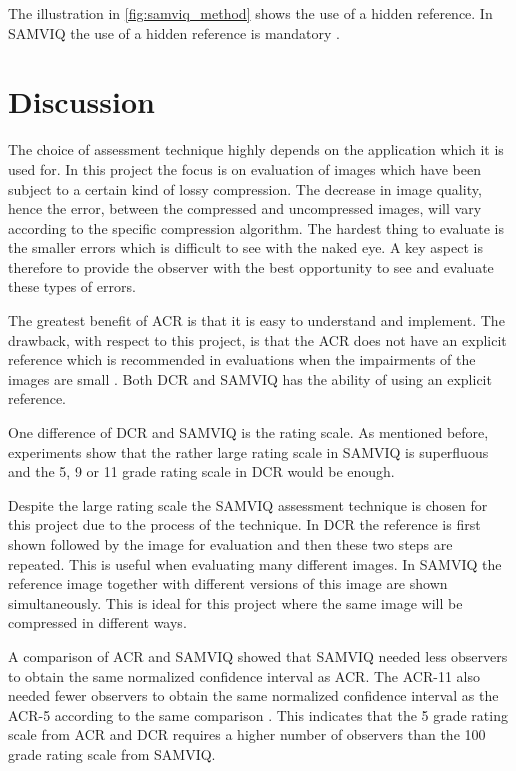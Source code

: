 The illustration in \autoref{fig:samviq_method} shows the use of a hidden reference. In SAMVIQ the use of a hidden reference is mandatory \cite{Kozamernik2005}.


\section{Discussion} %
\label{sec:discussion}

The choice of assessment technique highly depends on the application which it is used for. In this project the focus is on evaluation of images which have been subject to a certain kind of lossy compression. The decrease in image quality, hence the error, between the compressed and uncompressed images, will vary according to the specific compression algorithm. The hardest thing to evaluate is the smaller errors which is difficult to see with the naked eye. A key aspect is therefore to provide the observer with the best opportunity to see and evaluate these types of errors.

The greatest benefit of ACR is that it is easy to understand and implement. The drawback, with respect to this project, is that the ACR does not have an explicit reference which is recommended in evaluations when the impairments of the images are small \cite{ITU-TRecommendationP.9102008}. Both DCR and SAMVIQ has the ability of using an explicit reference.

One difference of DCR and SAMVIQ is the rating scale. As mentioned before, experiments show that the rather large rating scale in SAMVIQ is superfluous \cite{Rouse2010} and the 5, 9 or 11 grade rating scale in DCR would be enough.

Despite the large rating scale the SAMVIQ assessment technique is chosen for this project due to the process of the technique. In DCR the reference is first shown followed by the image for evaluation and then these two steps are repeated. This is useful when evaluating many different images. In SAMVIQ the reference image together with different versions of this image are shown simultaneously. This is ideal for this project where the same image will be compressed in different ways.

A comparison of ACR and SAMVIQ showed that SAMVIQ needed less observers to obtain the same normalized confidence interval as ACR. The ACR-11 also needed fewer observers to obtain the same normalized confidence interval as the ACR-5 according to the same comparison \cite{Rouse2010}. This indicates that the 5 grade rating scale from ACR and DCR requires a higher number of observers than the 100 grade rating scale from SAMVIQ.

